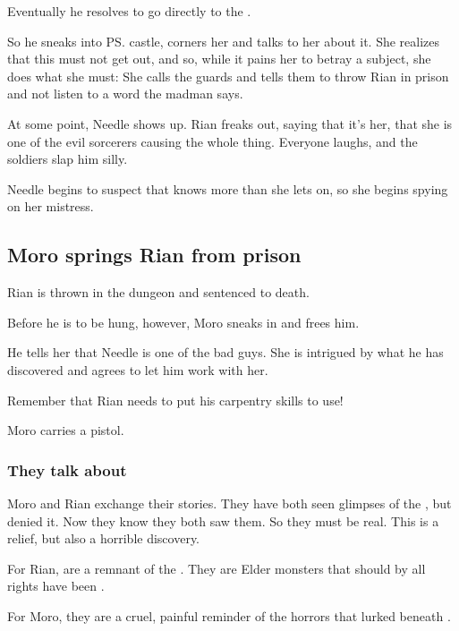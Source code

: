 Eventually he resolves to go directly to the \rinyuth. 

So he sneaks into \ps{\Tiroco} castle, corners her and talks to her about it. 
She realizes that this must not get out, and so, while it pains her to betray a subject, she does what she must: She calls the guards and tells them to throw Rian in prison and not listen to a word the madman says. 

At some point, Needle shows up. Rian freaks out, saying that it's her, that she is one of the evil sorcerers causing the whole thing. Everyone laughs, and the soldiers slap him silly. 

Needle begins to suspect that \Tiroco{} knows more than she lets on, so she begins spying on her mistress. 









\subsection{Moro springs Rian from prison}
Rian is thrown in the dungeon and sentenced to death. 

Before he is to be hung, however, Moro \Cobrel{} sneaks in and frees him. 

He tells her that Needle is one of the bad guys. 
She is intrigued by what he has discovered and agrees to let him work with her. 

Remember that Rian needs to put his carpentry skills to use! 

Moro carries a pistol. 





\subsubsection{They talk about \quiljaaran}
Moro and Rian exchange their stories. 
They have both seen glimpses of the , but denied it.
Now they know they both saw them. 
So they must be real. 
This is a relief, but also a horrible discovery.

For Rian, \quiljaaran are a remnant of the .
They are Elder monsters that should by all rights have been . 

For Moro, they are a cruel, painful reminder of the horrors that lurked beneath \Yormis. 










